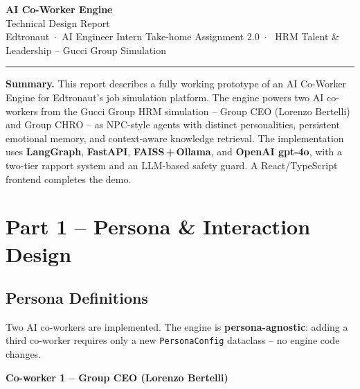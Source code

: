 \documentclass[11pt,a4paper]{article}
\begin{document}
\begin{center}
  {\LARGE\bfseries\color{indigodark} AI Co-Worker Engine}\\[0.4em]
  {\large Technical Design Report}\\[0.3em]
  {\normalsize\color{slategray}
    Edtronaut~$\cdot$~AI Engineer Intern Take-home Assignment 2.0~$\cdot$~
    HRM Talent \& Leadership -- Gucci Group Simulation}\\[0.8em]
  \color{coderule}\rule{0.6\linewidth}{0.8pt}
\end{center}
\vspace{0.4em}

\begin{mdframed}[backgroundcolor=indigolight,linecolor=indigodark,
                 linewidth=1pt,innerleftmargin=10pt,innerrightmargin=10pt,
                 innertopmargin=6pt,innerbottommargin=6pt]
\textbf{Summary.}
This report describes a fully working prototype of an AI Co-Worker Engine for
Edtronaut's job simulation platform. The engine powers two AI co-workers from
the Gucci Group HRM simulation -- Group CEO (Lorenzo Bertelli) and Group CHRO --
as NPC-style agents with distinct personalities, persistent emotional memory, and
context-aware knowledge retrieval. The implementation uses \textbf{LangGraph},
\textbf{FastAPI}, \textbf{FAISS\,+\,Ollama}, and \textbf{OpenAI gpt-4o}, with a
two-tier rapport system and an LLM-based safety guard. A React/TypeScript frontend
completes the demo.
\end{mdframed}
\vspace{0.8em}

\section{Part 1 -- Persona \& Interaction Design}

\subsection{Persona Definitions}

Two AI co-workers are implemented. The engine is \textbf{persona-agnostic}: adding
a third co-worker requires only a new \texttt{PersonaConfig} dataclass -- no engine
code changes.

\vspace{0.5em}
\noindent\textbf{Co-worker 1 -- Group CEO (Lorenzo Bertelli)}
\end{document}
